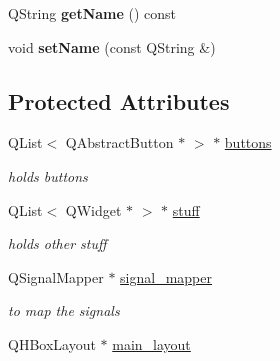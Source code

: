 \begin{CompactItemize}
\item 
\hypertarget{classinterface__view_0bef899e9ade91447c5f51e8869f0910}{
QString \textbf{getName} () const }
\label{classinterface__view_0bef899e9ade91447c5f51e8869f0910}

\item 
\hypertarget{classinterface__view_761dc6c1fbb26b2ef976c4c96b1eeaca}{
void \textbf{setName} (const QString \&)}
\label{classinterface__view_761dc6c1fbb26b2ef976c4c96b1eeaca}

\end{CompactItemize}
\subsection*{Protected Attributes}
\begin{CompactItemize}
\item 
\hypertarget{classinterface__view_f1e0c88fdecf4afb1df05258d6f350b8}{
QList$<$ QAbstractButton $\ast$ $>$ $\ast$ \hyperlink{classinterface__view_f1e0c88fdecf4afb1df05258d6f350b8}{buttons}}
\label{classinterface__view_f1e0c88fdecf4afb1df05258d6f350b8}

\begin{CompactList}\small\item\em holds buttons \item\end{CompactList}\item 
\hypertarget{classinterface__view_3a707948a6e7811d73f5e0a73d760e00}{
QList$<$ QWidget $\ast$ $>$ $\ast$ \hyperlink{classinterface__view_3a707948a6e7811d73f5e0a73d760e00}{stuff}}
\label{classinterface__view_3a707948a6e7811d73f5e0a73d760e00}

\begin{CompactList}\small\item\em holds other stuff \item\end{CompactList}\item 
\hypertarget{classinterface__view_57574d4f42c441ea5e13bea130338bc8}{
QSignalMapper $\ast$ \hyperlink{classinterface__view_57574d4f42c441ea5e13bea130338bc8}{signal\_\-mapper}}
\label{classinterface__view_57574d4f42c441ea5e13bea130338bc8}

\begin{CompactList}\small\item\em to map the signals \item\end{CompactList}\item 
\hypertarget{classinterface__view_61745ba0fc9cfd0de1388437ef61f3bd}{
QHBoxLayout $\ast$ \hyperlink{classinterface__view_61745ba0fc9cfd0de1388437ef61f3bd}{main\_\-layout}}
\label{classinterface__view_61745ba0fc9cfd0de1388437ef61f3bd}


\end{CompactItemize}
